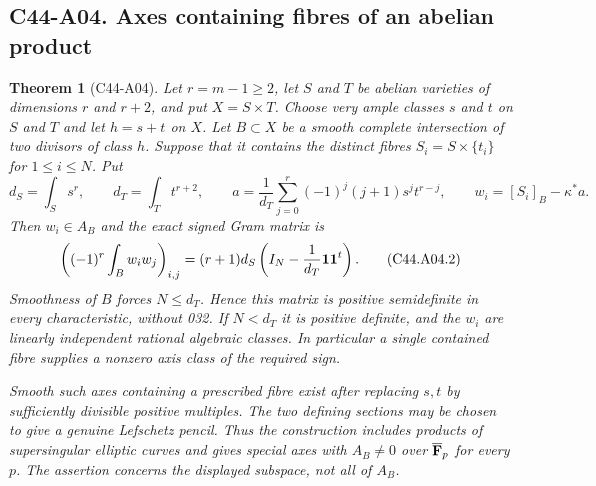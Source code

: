 \documentclass[11pt]{article}
\newtheorem{theorem}{Theorem}[section]
\theoremstyle{remark}\newtheorem{remark}[theorem]{Remark}
\begin{document}
\subsection*{C44-A04. Axes containing fibres of an abelian product}
\begin{theorem}[C44-A04]\label{thm:product-axis}
Let $r=m-1\ge2$, let $S$ and $T$ be abelian varieties of dimensions
$r$ and $r+2$, and put $X=S\times T$. Choose very ample classes
$s$ and $t$ on $S$ and $T$ and let $h=s+t$ on $X$. Let
$B\subset X$ be a smooth complete intersection of two divisors of
class $h$. Suppose that it contains the distinct fibres
$S_i=S\times\{t_i\}$ for $1\le i\le N$. Put
\[
 d_S=\int_Ss^r,\qquad d_T=\int_Tt^{r+2},\qquad
 a=\frac1{d_T}\sum_{j=0}^r(-1)^j(j+1)s^jt^{r-j},
 \qquad w_i=[S_i]_B-\kappa^*a.
 \tag{C44.A04.1}
\]
Then $w_i\in A_B$ and the exact signed Gram matrix is
\[
 \left((-1)^r\int_B w_iw_j\right)_{i,j}
       =(r+1)d_S\left(I_N-\frac1{d_T}{\bf1}{\bf1}^{t}\right).
 \tag{C44.A04.2}
\]
Smoothness of $B$ forces $N\le d_T$. Hence this matrix is positive
semidefinite in every characteristic, without 032. If $N<d_T$ it is
positive definite, and the $w_i$ are linearly independent rational
algebraic classes. In particular a single contained fibre supplies a
nonzero axis class of the required sign.

Smooth such axes containing a prescribed fibre exist after replacing
$s,t$ by sufficiently divisible positive multiples. The two defining
sections may be chosen to give a genuine Lefschetz pencil. Thus the
construction includes products of supersingular elliptic curves and
gives special axes with $A_B\ne0$ over $\overline{\mathbf F}_p$ for every $p$.
The assertion concerns the displayed subspace, not all of $A_B$.
\end{theorem}
\end{document}
